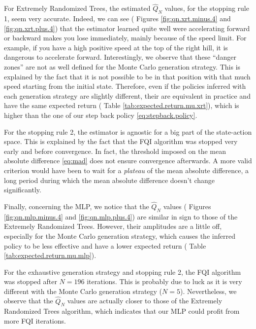 \documentclass[a4paper, 12pt]{article}
\begin{document}
    For Extremely Randomized Trees, the estimated $\hat{Q}_N$ values, for the stopping rule 1, seem very accurate. Indeed, we can see (\cf{} Figures \ref{fig:qn.xrt.minus.4} and \ref{fig:qn.xrt.plus.4}) that the estimator learned quite well were accelerating forward or backward makes you lose immediately, mainly because of the speed limit. For example, if you have a high positive speed at the top of the right hill, it is dangerous to accelerate forward. Interestingly, we observe that these \enquote{danger zones} are not as well defined for the Monte Carlo generation strategy. This is explained by the fact that it is not possible to be in that position with that much speed starting from the initial state. Therefore, even if the policies inferred with each generation strategy are slightly different, their are equivalent in practice and have the same expected return (\cf{} Table \ref{tab:expected.return.mu.xrt}), which is higher than the one of our step back policy \eqref{eq:stepback.policy}.
    
    For the stopping rule 2, the estimator is agnostic for a big part of the state-action space. This is explained by the fact that the FQI algorithm was stopped very early and before convergence. In fact, the threshold imposed on the mean absolute difference \eqref{eq:mad} does not ensure convergence afterwards. A more valid criterion would have been to wait for a \emph{plateau} of the mean absolute difference, \ie{} a long period during which the mean absolute difference doesn't change significantly.
    
    Finally, concerning the MLP, we notice that the $\hat{Q}_N$ values (\cf{} Figures \ref{fig:qn.mlp.minus.4} and \ref{fig:qn.mlp.plus.4}) are similar in sign to those of the Extremely Randomized Trees. However, their amplitudes are a little off, especially for the Monte Carlo generation strategy, which causes the inferred policy to be less effective and have a lower expected return (\cf{} Table \ref{tab:expected.return.mu.mlp}).
    
    For the exhaustive generation strategy and stopping rule 2, the FQI algorithm was stopped after $N = 196$ iterations. This is probably due to luck as it is very different with the Monte Carlo generation strategy ($N = 5$). Nevertheless, we observe that the $\hat{Q}_N$ values are actually closer to those of the Extremely Randomized Trees algorithm, which indicates that our MLP could profit from more FQI iterations.
    
    \newpage
    
\end{document}
